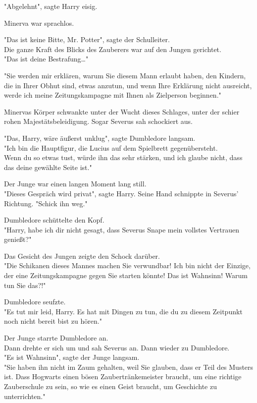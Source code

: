 {"Abgelehnt", sagte Harry eisig.

Minerva war sprachlos.

"Das ist keine Bitte, Mr. Potter", sagte der Schulleiter.\\ Die ganze Kraft des Blicks des Zauberers war auf den Jungen gerichtet.\\ "Das ist deine Bestrafung…"

"Sie werden mir erklären, warum Sie diesem Mann erlaubt haben, den Kindern, die in Ihrer Obhut sind, etwas anzutun, und wenn Ihre Erklärung nicht ausreicht, werde ich meine Zeitungskampagne mit Ihnen als Zielperson beginnen."

Minervas Körper schwankte unter der Wucht dieses Schlages, unter der schier rohen Majestätsbeleidigung. Sogar Severus sah schockiert aus.

"Das, Harry, wäre äußerst unklug", sagte Dumbledore langsam.\\ "Ich bin die Hauptfigur, die Lucius auf dem Spielbrett gegenübersteht.\\ Wenn du so etwas tust, würde ihn das sehr stärken, und ich glaube nicht, dass das deine gewählte Seite ist."

Der Junge war einen langen Moment lang still.\\ "Dieses Gespräch wird privat", sagte Harry. Seine Hand schnippte in Severus' Richtung. "Schick ihn weg."

Dumbledore schüttelte den Kopf.\\ "Harry, habe ich dir nicht gesagt, dass Severus Snape mein vollstes Vertrauen genießt?"

Das Gesicht des Jungen zeigte den Schock darüber.\\ "Die Schikanen dieses Mannes machen Sie verwundbar! Ich bin nicht der Einzige, der eine Zeitungskampagne gegen Sie starten könnte! Das ist Wahnsinn! Warum tun Sie das?!"

Dumbledore seufzte.\\ "Es tut mir leid, Harry. Es hat mit Dingen zu tun, die du zu diesem Zeitpunkt noch nicht bereit bist zu hören."

Der Junge starrte Dumbledore an.\\ Dann drehte er sich um und sah Severus an. Dann wieder zu Dumbledore.\\ "Es ist Wahnsinn", sagte der Junge langsam.\\ "Sie haben ihn nicht im Zaum gehalten, weil Sie glauben, dass er Teil des Musters ist. Dass Hogwarts einen bösen Zaubertränkemeister braucht, um eine richtige Zauberschule zu sein, so wie es einen Geist braucht, um Geschichte zu unterrichten."

}

